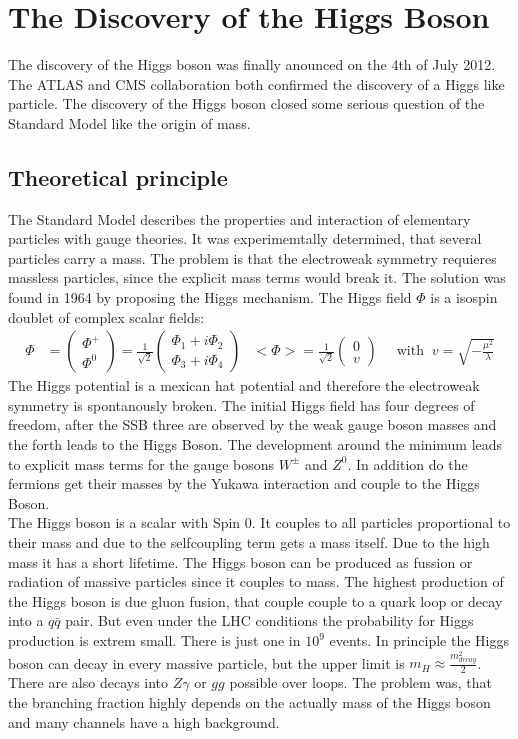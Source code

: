 \section{The Discovery of the Higgs Boson \cite{higgs}}
The discovery of the Higgs boson was finally anounced on the 4th of July 2012. The ATLAS and CMS collaboration both confirmed the discovery of a Higgs like particle. The discovery of the Higgs boson closed some serious question of the Standard Model like the origin of mass.
\subsection{Theoretical principle}
The Standard Model describes the properties and interaction of elementary particles with gauge theories. It was experimemtally determined, that several particles carry a mass. The problem is that the electroweak symmetry requieres massless particles, since the explicit mass terms would break it. The solution was found in 1964 by proposing the Higgs mechanism. The Higgs field $\Phi$ is a isospin doublet of complex scalar fields:
\begin{align*}
  \Phi &=
	\begin{pmatrix}
		\Phi^+ \\
		\Phi^0
		\end{pmatrix}
	= \frac{1}{\sqrt{2}}
  \begin{pmatrix}
    \Phi_1 + i \Phi_2 \\
    \Phi_3 + i \Phi_4
  \end{pmatrix}
		& <\Phi> = \frac{1}{\sqrt{2}}
		\begin{pmatrix}
			0 \\
			v
		\end{pmatrix}
		& \;\; \text{with} \;\; v = \sqrt{-\frac{\mu^2}{\lambda}}
\end{align*}
The Higgs potential is a mexican hat potential and therefore the electroweak symmetry is spontanously broken. The initial Higgs field has four degrees of freedom, after the SSB three are observed by the weak gauge boson masses and the forth leads to the Higgs Boson. The development around the minimum leads to explicit mass terms for the gauge bosons $W^{\pm}$ and $Z^0$. In addition do the fermions get their masses by the Yukawa interaction and couple to the Higgs Boson. \\
The Higgs boson is a scalar with Spin 0. It couples to all particles proportional to their mass and due to the selfcoupling term gets a mass itself. Due to the high mass it has a short lifetime. The Higgs boson can be produced as fussion or radiation of massive particles since it couples to mass. The highest production of the Higgs boson is due gluon fusion, that couple couple to a quark loop or decay into a $q\bar{q}$ pair. But even under the LHC conditions the probability for Higgs production is extrem small. There is just one in $10^9$ events. In principle the Higgs boson can decay in every massive particle, but the upper limit is $m_H\approx \frac{m_{decay}^2}{2}$. There are also decays into $Z\gamma$ or $gg$ possible over loops. The problem was, that the branching fraction highly depends on the actually mass of the Higgs boson and many channels have a high background.
